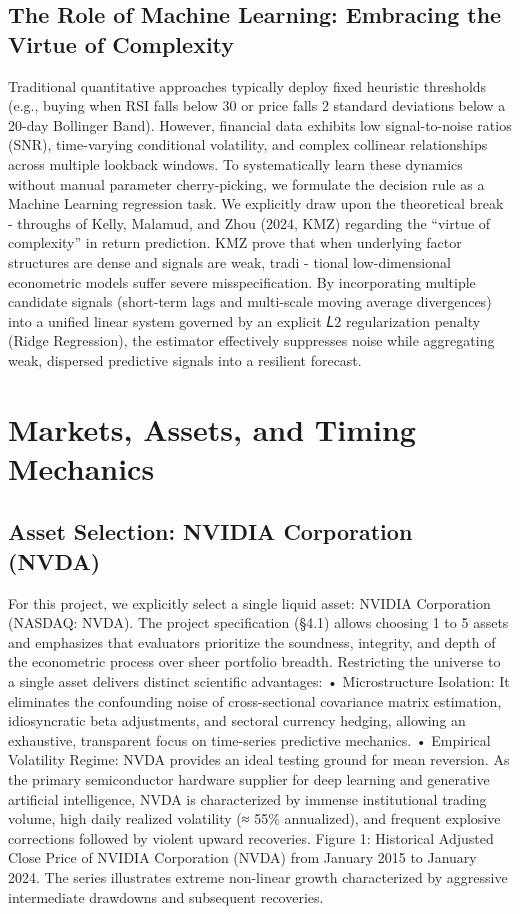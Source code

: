 \documentclass[12pt, a4paper]{article}
\begin{document}
\subsection{The Role of Machine Learning: Embracing the Virtue of Complexity}
Traditional quantitative approaches typically deploy fixed heuristic thresholds (e.g., buying when RSI 
falls below 30 or price falls 2 standard deviations below a 20-day Bollinger Band). However, financial 
data exhibits low signal-to-noise ratios (SNR), time-varying conditional volatility, and complex collinear 
relationships across multiple lookback windows.
To systematically learn these dynamics without manual parameter cherry-picking, we formulate the 
decision rule as a Machine Learning regression task. We explicitly draw upon the theoretical break -
throughs of Kelly, Malamud, and Zhou (2024, KMZ)  regarding the ``virtue of complexity'' in return 
prediction. KMZ prove that when underlying factor structures are dense and signals are weak, tradi -
tional low-dimensional econometric models suffer severe misspecification. By incorporating multiple 
candidate signals (short-term lags and multi-scale moving average divergences) into a unified linear 
system governed by an explicit 𝐿2 regularization penalty (Ridge Regression), the estimator effectively 
suppresses noise while aggregating weak, dispersed predictive signals into a resilient forecast.

\section{Markets, Assets, and Timing Mechanics}
\subsection{Asset Selection: NVIDIA Corporation (NVDA)}
For this project, we explicitly select a single liquid asset: NVIDIA Corporation (NASDAQ: NVDA). 
The project specification (§4.1) allows choosing 1 to 5 assets and emphasizes that evaluators prioritize 
the soundness, integrity, and depth of the econometric process over sheer portfolio breadth. Restricting 
the universe to a single asset delivers distinct scientific advantages:
• Microstructure Isolation: It eliminates the confounding noise of cross-sectional covariance matrix 
estimation, idiosyncratic beta adjustments, and sectoral currency hedging, allowing an exhaustive, 
transparent focus on time-series predictive mechanics.
• Empirical Volatility Regime: NVDA provides an ideal testing ground for mean reversion. As the 
primary semiconductor hardware supplier for deep learning and generative artificial intelligence, 
NVDA is characterized by immense institutional trading volume, high daily realized volatility (≈ 55\% 
annualized), and frequent explosive corrections followed by violent upward recoveries.
Figure 1: Historical Adjusted Close Price of NVIDIA Corporation (NVDA) from January 2015 to 
January 2024. The series illustrates extreme non-linear growth characterized by aggressive intermediate 
drawdowns and subsequent recoveries.
\end{document}
